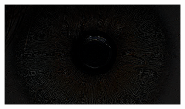 \documentclass{article}
\begin{document}
\begin{figure}[H]
\begin{subfigure}{.09\textwidth}
  \label{fig:arrow}
\end{subfigure}%
\begin{subfigure}{.47\textwidth}
  \centering
  \includegraphics[width=0.97\linewidth]{_Figures/raw_data_1_highpass.png}
  \caption{}
  \label{fig:raw_1_highpass}
\end{subfigure}


\end{figure}
\end{document}

